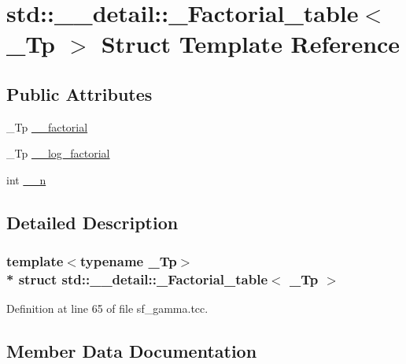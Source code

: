 \hypertarget{structstd_1_1____detail_1_1__Factorial__table}{}\section{std\+:\+:\+\_\+\+\_\+detail\+:\+:\+\_\+\+Factorial\+\_\+table$<$ \+\_\+\+Tp $>$ Struct Template Reference}
\label{structstd_1_1____detail_1_1__Factorial__table}
\subsection*{Public Attributes}
\begin{DoxyCompactItemize}
\item 
\+\_\+\+Tp \hyperlink{structstd_1_1____detail_1_1__Factorial__table_a4e8d20f3fa301037b097bb9f8e5f2060}{\+\_\+\+\_\+factorial}
\item 
\+\_\+\+Tp \hyperlink{structstd_1_1____detail_1_1__Factorial__table_a9d4b412d4d8b46ec660b0441516f412c}{\+\_\+\+\_\+log\+\_\+factorial}
\item 
int \hyperlink{structstd_1_1____detail_1_1__Factorial__table_a08dfe7484fca4bcdd1969ce2fa73edc6}{\+\_\+\+\_\+n}
\end{DoxyCompactItemize}


\subsection{Detailed Description}
\subsubsection*{template$<$typename \+\_\+\+Tp$>$\\*
struct std\+::\+\_\+\+\_\+detail\+::\+\_\+\+Factorial\+\_\+table$<$ \+\_\+\+Tp $>$}



Definition at line 65 of file sf\+\_\+gamma.\+tcc.



\subsection{Member Data Documentation}
